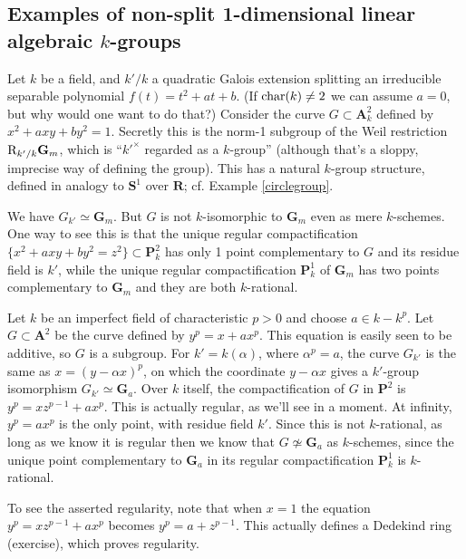 \documentclass[10pt]{article}
\renewcommand{\AA}{\mathbf{A}}
\newcommand{\PP}{\mathbf{P}}
\newcommand{\RR}{\mathbf{R}}
\renewcommand{\SS}{\mathbf{S}}
\renewcommand{\(}{\left(}
\renewcommand{\)}{\right)}
\numberwithin{thm}{subsection}
\begin{document}
\subsection{Examples of non-split 1-dimensional linear algebraic $k$-groups}
\begin{ex}Let $k$ be a field, and $k'/k$ a quadratic Galois extension
splitting an irreducible separable polynomial $f(t) = t^2 + at + b$. (If ${\rm{char}}(k) \ne 2$
we can assume $a = 0$, but why would one want to do that?) 
Consider the curve $G\subset \AA^2_k$ defined by $x^2 + axy + by^2 = 1$. 
Secretly this is the norm-1 subgroup of the Weil restriction
${\rm{R}}_{k'/k}\mathbf{G}_m$, which is ``$k'^\times$ regarded as a $k$-group'' (although
that's a sloppy, imprecise way of defining the group).
This has a natural $k$-group structure, defined in analogy
to $\SS^1$ over $\RR$; cf. Example \ref{circlegroup}.

We have $G_{k'} \simeq \mathbf{G}_m$.
But $G$ is not $k$-isomorphic to $\mathbf{G}_m$ even as mere $k$-schemes.
One way to see this is that the unique regular compactification
$\{x^2+axy + by^2=z^2\}\subset\PP^2_k$ has only 1 point complementary to $G$ and its residue field is 
$k'$, while the unique regular compactification $\PP^1_k$ 
of $\mathbf{G}_m$ has two points complementary to $\mathbf{G}_m$ and they are both $k$-rational.
\end{ex}
\begin{ex}
Let $k$ be an imperfect field of characteristic $p>0$
and choose $a\in k-k^p$.
Let $G\subset\AA^2$ be the curve
defined by $y^p=x+ax^p$.
This equation is easily seen to be additive,
so $G$ is a subgroup.
For $k'=k(\alpha)$, where $\alpha^p=a$,
the curve $G_{k'}$ is the same as $x=(y-\alpha x)^p$,
on which the coordinate $y-\alpha x$ gives
a $k'$-group isomorphism $G_{k'}\simeq \mathbf{G}_a$.
Over $k$ itself, the compactification of $G$
in $\PP^2$ is $y^p=xz^{p-1}+ax^p$.
This is actually regular, as we'll see in a moment. At infinity,
$y^p=ax^p$ is the only point, with residue field $k'$.
Since this is not $k$-rational, as long as we know it is regular then 
we know that $G\not\simeq \mathbf{G}_a$ as $k$-schemes, since the unique point complementary
to $\mathbf{G}_a$ in its regular compactification $\PP^1_k$ is $k$-rational.

To see the asserted regularity, note that when $x=1$ the equation $y^p=xz^{p-1}+ax^p$
becomes $y^p=a+z^{p-1}$. This actually defines a Dedekind ring (exercise), which proves regularity.
\end{ex}
\end{document}
